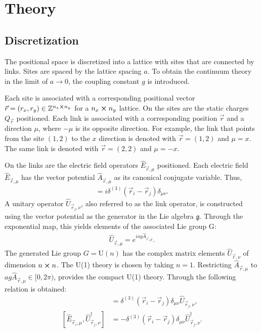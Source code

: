 \section{Theory}
\subsection{Discretization}

The positional space is discretized into a lattice with sites that are connected by links. Sites are spaced by the lattice spacing $a$. To obtain the continuum theory in the limit of $a\rightarrow 0$, the coupling constant $g$ is introduced.\cite{RevModPhys.51.659}

Each site is associated with a corresponding positional vector $\vec{r}=(r_x, r_y)\in \mathbb{Z}^{n_{x} \cross n_{y}}$ for a $n_{x} \cross n_{y}$ lattice. On the sites are the static charges $Q_{\vec{r}}$ positioned. Each link is associated with a corresponding position $\vec{r}$ and a direction $\mu$, where $-\mu$ is its opposite direction. For example, the link that points from the site $(1, 2)$ to the $x$ direction is denoted with $\vec{r}=(1, 2)$ and $\mu=x$. The same link is denoted with $\vec{r}=(2, 2)$ and $\mu=-x$.

On the links are the electric field operators $\hat{E}_{\vec{r},\mu}$ positioned. Each electric field $\hat{E}_{\vec{r}, \mu}$ has the vector potential $\hat{A}_{\vec{r}, \mu}$ as its canonical conjugate variable. Thus,
\begin{align}
  [\hat{E}_{\vec{r}_{i}, \mu}, \hat{A}_{\vec{r}_{j}, \nu}]=i\delta^{(3)}(\vec{r}_{i}-\vec{r}_{j})\delta_{\mu\nu}.\label{eq:com}
\end{align}
A unitary operator $\hat{U}_{\vec{r}_{j}, \nu}$, also referred to as the link operator, is constructed using the vector potential as the generator in the Lie algebra $\mathfrak{g}$. Through the exponential map, this yields elements of the associated Lie group G:
\begin{align}
	\hat{U}_{\vec{r}, \mu} = e^{iag\hat{A}_{\vec{r}, \mu}}.\label{eq:exp}
\end{align}
The generated Lie group $G=\text{U}(n)$ has the complex matrix elements $\hat{U}_{\vec{r}, \nu}$ of dimension $n\cross n$. The U(1) theory is chosen by taking $n=1$. Restricting $\hat{A}_{\vec{r}, \mu}$ to $ag\hat{A}_{\vec{r}, \mu}\in[0, 2\pi)$, provides the compact U(1) theory. Through  the following relation is obtained: 
\begin{align}
  [\hat{E}_{\vec{r}_{i}, \mu}, \hat{U}_{\vec{r}_{j}, \nu}]      & =\delta^{(3)}(\vec{r}_{i}-\vec{r}_{j})\delta_{\mu\nu}\hat{U}_{\vec{r}_{j}, \nu},\label{eq:comu1}       \\
  [\hat{E}_{\vec{r}_{i}, \mu}, \hat{U}_{\vec{r}_{j}, \nu}^\dag] & =-\delta^{(3)}(\vec{r}_{i}-\vec{r}_{j})\delta_{\mu\nu}\hat{U}_{\vec{r}_{j}, \nu}^{\dag}. \label{eq:comu2}
\end{align}

